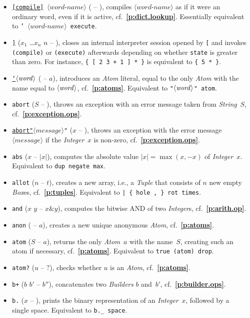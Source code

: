 \documentclass[12pt,oneside]{article}
\def\refpoint#1{{\rm\textbf{\ref{#1}}}}
\let\ptref=\refpoint
\begin{document}
\begin{itemize}
\item {\tt \underline{[compile]} $\langle\textit{word-name}\rangle$} ( -- ), compiles $\langle\textit{word-name}\rangle$ as if it were an ordinary word, even if it is active, cf.~\ptref{p:dict.lookup}. Essentially equivalent to {\tt ' $\langle\textit{word-name}\rangle$ execute}.
\item {\tt \underline{]}} ($x_1$ \dots $x_n$ $n$ -- ), closes an internal interpreter session opened by {\tt [} and invokes {\tt (compile)} or {\tt (execute)} afterwards depending on whether {\tt state} is greater than zero. For instance, {\tt \{ [ 2 3 + 1 ] * \}} is equivalent to {\tt \{ 5 * \}}.
\item {\tt \underline{`}$\langle\textit{word\/}\rangle$} ( -- $a$), introduces an {\em Atom\/} literal, equal to the only {\em Atom\/} with the name equal to $\langle\textit{word\/}\rangle$, cf.~\ptref{p:atoms}. Equivalent to {\tt "$\langle\textit{word\/}\rangle$" atom}.
\item {\tt abort} ($S$ -- ), throws an exception with an error message taken from {\em String\/}~$S$, cf.~\ptref{p:exception.ops}.
\item {\tt \underline{abort"}$\langle\textit{message}\rangle$"} ($x$ -- ), throws an exception with the error message $\langle\textit{message}\rangle$ if the {\em Integer\/}~$x$ is non-zero, cf.~\ptref{p:exception.ops}.
\item {\tt abs} ($x$ -- $|x|$), computes the absolute value $|x|=\max(x,-x)$ of {\em Integer\/}~$x$. Equivalent to {\tt dup negate max}.
\item {\tt allot} ($n$ -- $t$), creates a new array, i.e., a {\em Tuple\/} that consists of $n$ new empty {\em Box\/}es, cf.~\ptref{p:tuples}. Equivalent to {\tt | \{ hole , \} rot times}.
\item {\tt and} ($x$ $y$ -- $x\& y$), computes the bitwise AND of two {\em Integer\/}s, cf.~\ptref{p:arith.op}.
\item {\tt anon} ( -- $a$), creates a new unique anonymous {\em Atom}, cf.~\ptref{p:atoms}.
\item {\tt atom} ($S$ -- $a$), returns the only {\em Atom\/}~$a$ with the name~$S$, creating such an atom if necessary, cf.~\ptref{p:atoms}. Equivalent to {\tt true (atom) drop}.
\item {\tt atom?} ($u$ -- $?$), checks whether $u$ is an {\em Atom}, cf.~\ptref{p:atoms}.
\item {\tt b+} ($b$ $b'$ -- $b''$), concatenates two {\em Builders\/} $b$ and~$b'$, cf.~\ptref{p:builder.ops}.
\item {\tt b.} ($x$ -- ), prints the binary representation of an {\em Integer\/}~$x$, followed by a single space. Equivalent to {\tt b.\_ space}.

\end{itemize}
\end{document}
